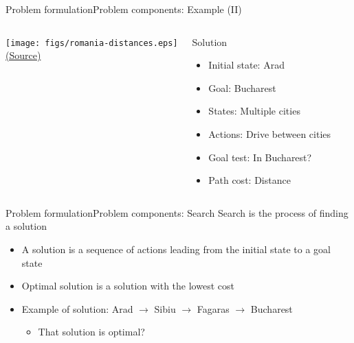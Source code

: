 \documentclass[10pt,compress]{beamer} %
\begin{document}
\begin{frame}{Problem formulation}{Problem components: Example (II)}

       \begin{columns}
    \begin{center}
	    \texttt{[image: figs/romania-distances.eps]}\\
	    \tiny{\href{http://aima.cs.berkeley.edu/index.html}{(Source)}}
	\end{center}

    \begin{exampleblock}{Solution}
        \begin{itemize}
            \item Initial state: Arad
            \item Goal: Bucharest
            \item States: Multiple cities
            \item Actions: Drive between cities
            \item Goal test: In Bucharest?
            \item Path cost: Distance
        \end{itemize}
    \end{exampleblock}

       \end{columns}
\end{frame}

\begin{frame}{Problem formulation}{Problem components: Search}
    \alert{Search} is the process of finding a solution
        \begin{itemize}
            \item A \alert{solution} is a sequence of actions leading from the initial state to a goal state
            \item \alert{Optimal solution} is a solution with the lowest cost
            \item Example of solution: Arad $\rightarrow$ Sibiu $\rightarrow$ Fagaras $\rightarrow$ Bucharest
                \begin{itemize}
                \item That solution is optimal?
                \end{itemize}
        \end{itemize}
\end{frame}
\end{document}
